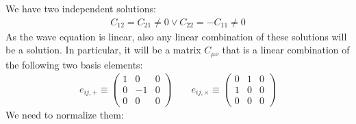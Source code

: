 \documentclass[../template.tex]{subfiles}
\begin{document}
We have two independent solutions:
\begin{align*}
    C_{12} = C_{21} \neq 0 \lor C_{22} = -C_{11} \neq 0
\end{align*}
As the wave equation is linear, also any linear combination of these solutions will be a solution. In particular, it will be a matrix $C_{\mu \nu}$ that is a linear combination of the following two basis elements:
\begin{align*}
    e_{ij,+} \equiv \left(\begin{array}{ccc}
    1 & 0 & 0 \\ 
    0 & -1 & 0 \\ 
    0 & 0 & 0
    \end{array}\right) \qquad e_{ij,\times} \equiv \left(\begin{array}{ccc}
    0 & 1 & 0 \\ 
    1 & 0 & 0 \\ 
    0 & 0 & 0
    \end{array}\right)
\end{align*}
We need to normalize them:
\end{document}
